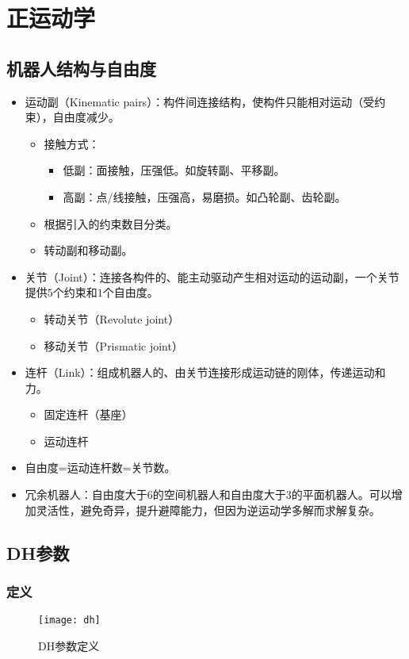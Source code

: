 \documentclass[
12pt, %
a4paper, 
oneside, %
headinclude,footinclude, %
]{scrartcl}
\begin{document}
\section{正运动学}
\subsection[机器人结构与自由度]{机器人结构与自由度}
\begin{itemize}
\item 运动副（Kinematic pairs）：构件间连接结构，使构件只能相对运动（受约束），自由度减少。
\begin{itemize}
\item 接触方式：
\begin{itemize}
\item 低副：面接触，压强低。如旋转副、平移副。
\item 高副：点/线接触，压强高，易磨损。如凸轮副、齿轮副。
\end{itemize}
\item 根据引入的约束数目分类。
\item 转动副和移动副。
\end{itemize}
\item 关节（Joint）：连接各构件的、能主动驱动产生相对运动的运动副，一个关节提供$ 5 $个约束和$ 1 $个自由度。
\begin{itemize}
\item 转动关节（Revolute joint）
\item 移动关节（Prismatic joint）
\end{itemize}
\item 连杆（Link）：组成机器人的、由关节连接形成运动链的刚体，传递运动和力。
\begin{itemize}
\item 固定连杆（基座）
\item 运动连杆
\end{itemize}
\item 自由度=运动连杆数=关节数。
\item 冗余机器人：自由度大于$ 6 $的空间机器人和自由度大于$ 3 $的平面机器人。可以增加灵活性，避免奇异，提升避障能力，但因为逆运动学多解而求解复杂。
\end{itemize}
\subsection[DH参数]{DH参数}
\subsubsection[定义]{定义}
\begin{figure}[H]
\centering 
\texttt{[image: dh]} 
\caption{DH参数定义}
\end{figure}
\end{document}
